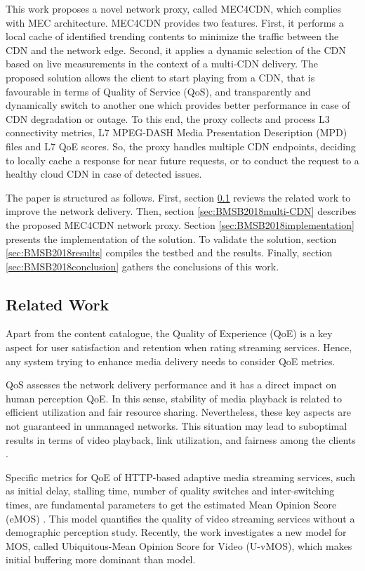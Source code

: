 This work proposes a novel network proxy, called MEC4CDN, which complies with MEC architecture. MEC4CDN provides two features. First, it performs a local cache of identified trending contents to minimize the traffic between the CDN and the network edge. Second, it applies a dynamic selection of the CDN based on live measurements in the context of a multi-CDN delivery. The proposed solution allows the client to start playing from a CDN, that is favourable in terms of Quality of Service (QoS), and transparently and dynamically switch to another one which provides better performance in case of CDN degradation or outage. To this end, the proxy collects and process L3 connectivity metrics, L7 MPEG-DASH Media Presentation Description (MPD) files and L7 QoE scores. So, the proxy handles multiple CDN endpoints, deciding to locally cache a response for near future requests, or to conduct the request to a healthy cloud CDN in case of detected issues.

The paper is structured as follows. First, section \ref{sec:BMSB2018related} reviews the related work to improve the network delivery. Then, section \ref{sec:BMSB2018multi-CDN} describes the proposed MEC4CDN network proxy. Section \ref{sec:BMSB2018implementation} presents the implementation of the solution. To validate the solution, section \ref{sec:BMSB2018results} compiles the testbed and the results. Finally, section \ref{sec:BMSB2018conclusion} gathers the conclusions of this work.

\subsection{Related Work}
\label{sec:BMSB2018related}

Apart from the content catalogue, the Quality of Experience (QoE) is a key aspect for user satisfaction and retention when rating streaming services. Hence, any system trying to enhance media delivery needs to consider QoE metrics.

QoS assesses the network delivery performance and it has a direct impact on human perception QoE. In this sense, stability of media playback is related to efficient utilization and fair resource sharing. Nevertheless, these key aspects are not guaranteed in unmanaged networks. This situation may lead to suboptimal results in terms of video playback, link utilization, and fairness among the clients \cite{chen2016}. 

Specific metrics for QoE of HTTP-based adaptive media streaming services, such as initial delay, stalling time, number of quality switches and inter-switching times, are fundamental parameters to get the estimated Mean Opinion Score (eMOS) \cite{claeys2014}. This model quantifies the quality of video streaming services without a demographic perception study. Recently, the work \cite{lentisco2017} investigates a new model for MOS, called Ubiquitous-Mean Opinion Score for Video (U-vMOS), which makes initial buffering more dominant than \cite{claeys2014} model.

